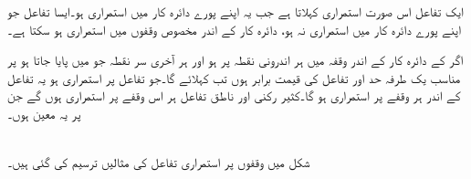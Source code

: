 ایک تفاعل  اس صورت استمراری کہلاتا ہے جب یہ اپنے پورے دائرہ کار میں استمراری ہو۔ایسا تفاعل جو اپنے پورے دائرہ کار میں استمراری نہ ہو، دائرہ کار کے اندر مخصوص وقفوں میں استمراری ہو سکتا ہے۔
 
اگر  کے دائرہ کار کے اندر  وقفہ  میں  ہر اندرونی نقطہ  پر  ہو اور ہر آخری سر نقطہ جو  میں پایا جاتا ہو پر مناسب یک طرفہ حد اور تفاعل کی قیمت برابر ہوں تب    کہلائے گا۔جو تفاعل  پر استمراری ہو یہ تفاعل  کے اندر ہر وقفے پر استمراری ہو گا۔کثیر رکنی اور ناطق تفاعل ہر اس وقفے پر استمراری ہوں گے جن پر یہ معین ہوں۔


\\
شکل  میں وقفوں پر  استمراری تفاعل کی مثالیں ترسیم کی گئی ہیں۔ 
